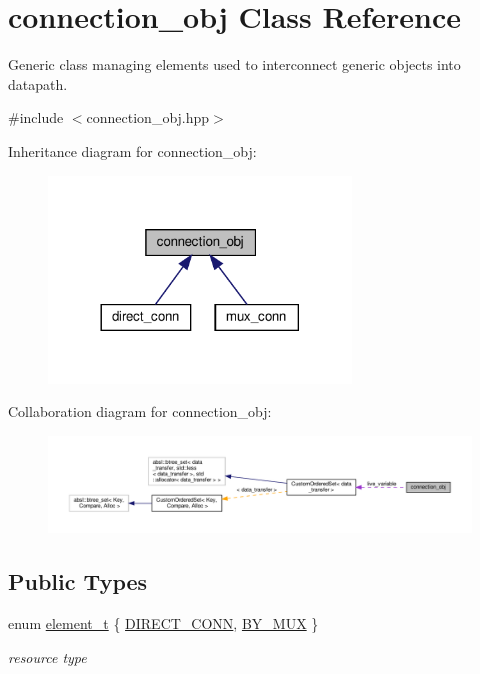 \hypertarget{classconnection__obj}{}\section{connection\+\_\+obj Class Reference}
\label{classconnection__obj}


Generic class managing elements used to interconnect generic objects into datapath.  




{\ttfamily \#include $<$connection\+\_\+obj.\+hpp$>$}



Inheritance diagram for connection\+\_\+obj\+:
\nopagebreak
\begin{figure}[H]
\begin{center}
\leavevmode
\includegraphics[width=228pt]{d7/d99/classconnection__obj__inherit__graph}
\end{center}
\end{figure}


Collaboration diagram for connection\+\_\+obj\+:
\nopagebreak
\begin{figure}[H]
\begin{center}
\leavevmode
\includegraphics[width=350pt]{d7/dc3/classconnection__obj__coll__graph}
\end{center}
\end{figure}
\subsection*{Public Types}
\begin{DoxyCompactItemize}
\item 
enum \hyperlink{classconnection__obj_a28fc8ddc2893b5ef328f75147a18f6c6}{element\+\_\+t} \{ \hyperlink{classconnection__obj_a28fc8ddc2893b5ef328f75147a18f6c6ada70362adea175330d0066a4ac6662c8}{D\+I\+R\+E\+C\+T\+\_\+\+C\+O\+NN}, 
\hyperlink{classconnection__obj_a28fc8ddc2893b5ef328f75147a18f6c6a6f6d564b6b69a297329a6aec63523802}{B\+Y\+\_\+\+M\+UX}
 \}\begin{DoxyCompactList}\small\item\em resource type \end{DoxyCompactList}
\end{DoxyCompactItemize}
